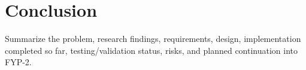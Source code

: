 \chapter{Conclusion}
Summarize the problem, research findings, requirements, design, implementation completed so far, testing/validation status, risks, and planned continuation into FYP-2.
